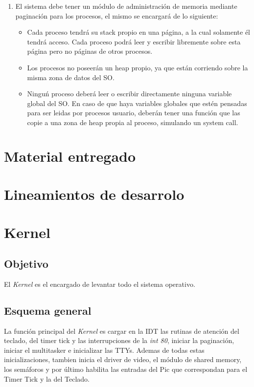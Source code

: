 \documentclass[10pt,a4paper]{article}
\begin{document}
\begin{enumerate}
			\item El sistema debe tener un m\'odulo de administraci\'on de memoria mediante paginaci\'on para los procesos, el mismo se encargar\'a de lo siguiente:
			\begin{itemize}
				\item Cada proceso tendr\'a su stack propio en una p\'agina, a la cual solamente  \'el tendr\'a acceso. Cada proceso podr\'a leer y escribir libremente sobre esta p\'agina pero no p\'aginas de otros procesos.
				\item Los procesos no poseer\'an un heap propio, ya que est\'an corriendo sobre la misma zona de datos del SO.
				\item Ningu\'n proceso deber\'a leer o escribir directamente ninguna variable global del SO. En caso de que haya variables globales que est\'en pensadas para ser leidas por procesos usuario, deber\'an tener una funci\'on que las copie a una zona de heap propia al proceso, simulando un system call.
			\end{itemize}
		\end{enumerate}

\section{Material entregado}
	
\section{Lineamientos de desarrolo}

\section{Kernel}
	\subsection{Objetivo}
		El \textit{Kernel} es el encargado de levantar todo el sistema operativo.
	\subsection{Esquema general}
		La funci\'on principal del \textit{Kernel} es cargar en la IDT las rutinas de atenci\'on del teclado, del timer tick y las interrupciones de la \textit{int 80}, iniciar la paginaci\'on, iniciar el multitasker e inicializar las TTYs. Ademas de todas estas inicializaciones, tambien inicia el driver de video, el m\'odulo de shared memory, los sem\'aforos y por \'ultimo habilita las entradas del Pic que correspondan para el Timer Tick y la del Teclado. 
\end{document}
